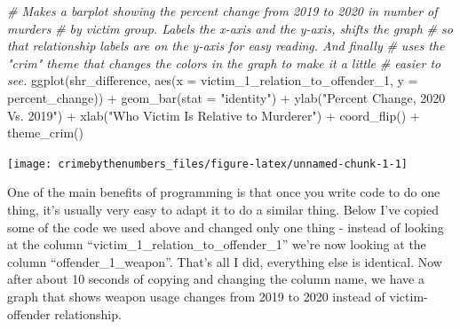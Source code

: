 \documentclass[
]{krantz}
\makeatletter
\newenvironment{Shaded}{\begin{snugshade}}{\end{snugshade}}
\newcommand{\AttributeTok}[1]{\textcolor[rgb]{0.61,0.61,0.61}{#1}}
\newcommand{\CommentTok}[1]{\textcolor[rgb]{0.37,0.37,0.37}{\textit{#1}}}
\newcommand{\FunctionTok}[1]{\textcolor[rgb]{0,0,0}{#1}}
\newcommand{\NormalTok}[1]{#1}
\newcommand{\SpecialCharTok}[1]{\textcolor[rgb]{0,0,0}{#1}}
\newcommand{\StringTok}[1]{\textcolor[rgb]{0.5,0.5,0.5}{#1}}
\newenvironment{kframe}{%
\medskip{}
\setlength{\fboxsep}{.8em}
 \def\at@end@of@kframe{}%
 \ifinner\ifhmode%
  \def\at@end@of@kframe{\end{minipage}}%
  \begin{minipage}{\columnwidth}%
 \fi\fi%
 \def\FrameCommand##1{\hskip\@totalleftmargin \hskip-\fboxsep
 \colorbox{shadecolor}{##1}\hskip-\fboxsep
     \hskip-\linewidth \hskip-\@totalleftmargin \hskip\columnwidth}%
 \MakeFramed {\advance\hsize-\width
   \@totalleftmargin\z@ \linewidth\hsize
   \@setminipage}}%
 {\par\unskip\endMakeFramed%
 \at@end@of@kframe}
\renewenvironment{Shaded}{\begin{kframe}}{\end{kframe}}
\makeatother
\begin{document}
\begin{Shaded}
\begin{Highlighting}[]
\CommentTok{\# Makes a barplot showing the percent change from 2019 to 2020 in number of murders}
\CommentTok{\# by victim group. Labels the x{-}axis and the y{-}axis, shifts the graph}
\CommentTok{\# so that relationship labels are on the y{-}axis for easy reading. And finally}
\CommentTok{\# uses the "crim" theme that changes the colors in the graph to make it a little}
\CommentTok{\# easier to see.}
\FunctionTok{ggplot}\NormalTok{(shr\_difference, }\FunctionTok{aes}\NormalTok{(}\AttributeTok{x =}\NormalTok{ victim\_1\_relation\_to\_offender\_1, }
                                        \AttributeTok{y =}\NormalTok{ percent\_change)) }\SpecialCharTok{+}
  \FunctionTok{geom\_bar}\NormalTok{(}\AttributeTok{stat =} \StringTok{"identity"}\NormalTok{) }\SpecialCharTok{+}
  \FunctionTok{ylab}\NormalTok{(}\StringTok{"Percent Change, 2020 Vs. 2019"}\NormalTok{) }\SpecialCharTok{+}
  \FunctionTok{xlab}\NormalTok{(}\StringTok{"Who Victim Is Relative to Murderer"}\NormalTok{) }\SpecialCharTok{+} 
  \FunctionTok{coord\_flip}\NormalTok{() }\SpecialCharTok{+}
  \FunctionTok{theme\_crim}\NormalTok{() }
\end{Highlighting}
\end{Shaded}

\begin{center}\texttt{[image: crimebythenumbers\_files/figure-latex/unnamed-chunk-1-1]} \end{center}

One of the main benefits of programming is that once you write code to do one thing, it's usually very easy to adapt it to do a similar thing. Below I've copied some of the code we used above and changed only one thing - instead of looking at the column ``victim\_1\_relation\_to\_offender\_1'' we're now looking at the column ``offender\_1\_weapon''. That's all I did, everything else is identical. Now after about 10 seconds of copying and changing the column name, we have a graph that shows weapon usage changes from 2019 to 2020 instead of victim-offender relationship.
\end{document}
